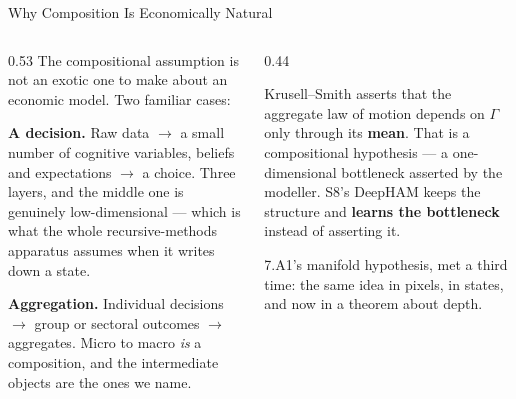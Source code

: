\begin{frame}{Why Composition Is Economically Natural}
\begin{columns}[T]
\begin{column}{0.53\textwidth}
\small
The compositional assumption is not an exotic one to make about an economic model. Two familiar cases:
\medskip

\textbf{A decision.} Raw data $\to$ a small number of cognitive variables, beliefs and expectations $\to$ a choice. Three layers, and the middle one is genuinely low-dimensional --- which is what the whole recursive-methods apparatus assumes when it writes down a state.
\medskip

\textbf{Aggregation.} Individual decisions $\to$ group or sectoral outcomes $\to$ aggregates. Micro to macro \emph{is} a composition, and the intermediate objects are the ones we name.
\end{column}
\begin{column}{0.44\textwidth}
\begin{takeawaybox}[title=\textbf{The connection worth making}]\small
Krusell--Smith asserts that the aggregate law of motion depends on $\Gamma$ only through its \textbf{mean}. That is a compositional hypothesis --- a one-dimensional bottleneck asserted by the modeller.
\medskip
S8's DeepHAM keeps the structure and \textbf{learns the bottleneck} instead of asserting it.
\end{takeawaybox}
\medskip
\begin{examplebox}\footnotesize
7.A1's manifold hypothesis, met a third time: the same idea in pixels, in states, and now in a theorem about depth.
\end{examplebox}
\end{column}
\end{columns}
\vspace{1mm}
\end{frame}

